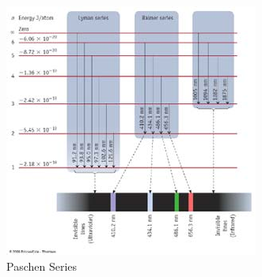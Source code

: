 \documentclass[
	chapter=7,
	title={Quantum Theory {\&} the Electronic Structure of Atoms},
	showanswers=true,
]{chem122notes}
\begin{document}
\begin{figure}[H]
	\centering
	\includegraphics[width=\textwidth]{chapter7/paschen_series}
	\caption{Paschen Series}
	\label{fig:paschen-series}
\end{figure}
\end{document}
